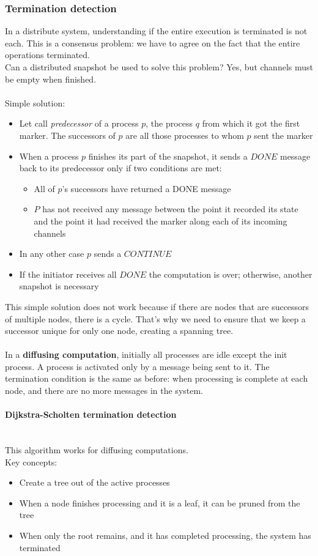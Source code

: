 \documentclass[10pt,a4paper]{article}
\newcommand{\myparagraph}[1]{\paragraph{#1}\mbox{}\\[0.05in]}
\begin{document}
\subsubsection{Termination detection}
In a distribute system, understanding if the entire execution is terminated is not each. This is a consensus problem: we have to agree on the fact that the entire operations terminated. \\ Can a distributed snapshot be used to solve this problem? Yes, but channels must be empty when finished. \\ \\ Simple solution:
\begin{itemize}
	\item Let call \textit{predecessor} of a process $p$, the process $q$ from which it got the first marker. The successors of $p$ are all those processes to whom $p$ sent the marker
	\item When a process $p$ finishes its part of the snapshot, it sends a $DONE$ message back to its predecessor only if two conditions are met:
	\begin{itemize}
		\item All of $p$'s successors have returned a DONE message
		\item $P$ has not received any message between the point it recorded its state and the point it had received the marker along each of its incoming channels
	\end{itemize}
	\item In any other case $p$ sends a $CONTINUE$
	\item If the initiator receives all $DONE$ the computation is over; otherwise, another snapshot is necessary
\end{itemize}
This simple solution does not work because if there are nodes that are successors of multiple nodes, there is a cycle. That's why we need to ensure that we keep a successor unique for only one node, creating a spanning tree. \\ \\
In a \textbf{diffusing computation}, initially all processes are idle except the init process. A process is activated only by a message being sent to it. The termination condition is the same as before: when processing is complete at each node, and there are no more messages in the system.
\myparagraph{Dijkstra-Scholten termination detection}
This algorithm works for diffusing computations. \\
Key concepts:
\begin{itemize}
	\item Create a tree out of the active processes
	\item When a node finishes processing and it is a leaf, it can be pruned from the tree
	\item When only the root remains, and it has completed processing, the system has terminated
\end{itemize}
\end{document}
